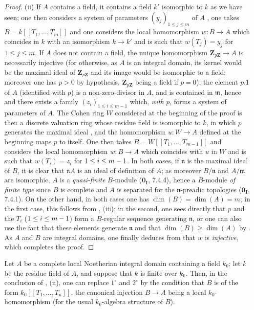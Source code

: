 \begin{proof}
\medskip
\noindent(ii)\enspace
If $A$ contains a field, it contains a field $k'$ isomorphic to $k$ as we have seen; one then considers a system of parameters $(y_j)_{1\leq j\leq m}$ of $A$ , one takes $B=k[[T_1,\ldots,T_m]]$ and one considers the local homomorphism $w:B\to A$ which coincides in $k$ with an isomorphism $k\to k'$ and is such that $w(T_j)=y_j$ for $1\leq j\leq m$.
If $A$ does not contain a field, the unique homomorphism $\mathbf{Z}_{p\mathbf{Z}}\to A$  is necessarily injective (for otherwise, as $A$ is an integral domain, its kernel would be the maximal ideal of $\mathbf{Z}_{p\mathbf{Z}}$ and its image would be isomorphic to a field; moreover one has $p>0$ by hypothesis, $\mathbf{Z}_{p\mathbf{Z}}$ being a field if $p=0$); the element $p.1$ of $A$ (identified with $p$) is a non-zero-divisor in $A$, and is contained in $\mathfrak{m}$, hence  and  there exists a family $(z_i)_{1\leq i\leq m-1}$ which, \emph{with $p$}, forms a system of parameters of $A$.
The Cohen ring $W$ considered at the beginning of the proof is then a discrete valuation ring whose residue field is isomorphic to $k$, in which $p$ generates the maximal ideal , and the homomorphism $u:W\to A$ defined at the beginning maps $p$ to itself.
One then takes $B=W[[T_1,\ldots,T_{m-1}]]$ and considers the local homomorphism $w:B\to A$ which coincides with $u$ in $W$ and is such that $w(T_i)=z_i$ for $1\leq i\leq m- 1$.
In both cases, if $\mathfrak{n}$ is the maximal ideal of $B$, it is clear that $\mathfrak{n}A$ is an ideal of definition of $A$; as moreover $B/\mathfrak{n}$ and $A/\mathfrak{m}$ are isomorphic, $A$ is a \emph{quasi-finite} $B$-module ($\mathbf{0_I}$, 7.4.4), hence a $B$-module \emph{of finite type} since $B$ is complete and $A$ is separated for the $\mathfrak{n}$-preadic topologies ($\mathbf{0_I}$, 7.4.1).
On the other hand, in both cases one has $\dim(B)=\dim(A)=m$; in the first case, this follows from , (iii); in the second, one sees directly that $p$ and the $T_i$ ($1\leq i\leq m- 1$) form a $B$-regular sequence generating $\mathfrak{n}$, or one can also use the fact that these elements generate $\mathfrak{n}$ and that $\dim(B)\geq\dim(A)$ by .
As $A$ and $B$ are integral domains, one finally deduces from  that $w$ is \emph{injective}, which completes the proof.
\end{proof}

\begin{corollary}[19.8.9]
\label{0.19.8.9}
Let $A$ be a complete local Noetherian integral domain containing a field $k_0$; let $k$ be the residue field of $A$, and suppose that $k$ is finite over $k_0$.
Then, in the conclusion of , \textup{(ii)}, one can replace $1^\circ$ and $2^\circ$ by the condition that $B$ is of the form $k_0[[T_1,\ldots,T_n]]$, the canonical injection $B\to A$ being a local $k_0$-homomorphism (for the usual $k_0$-algebra structure of $B$).
\end{corollary}

